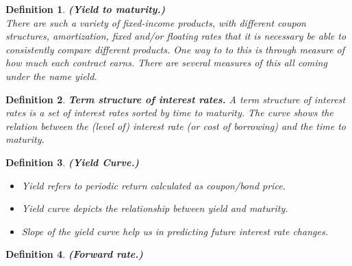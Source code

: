 \documentclass{book}
\newtheorem{definition}{Definition}[section]
\begin{document}
\begin{definition}\textbf{(Yield to maturity.)}\\
There are such a variety of fixed-income products, with different coupon structures, amortization, fixed and/or floating rates that it is necessary  be able to consistently compare different products. One way to to this is through measure of how much each contract earns. There are several measures of this all coming under the name yield.
\end{definition}
\begin{definition}
\textbf{Term structure of interest rates.}
A term structure of interest rates is a set of interest rates sorted by time to maturity. The curve shows the relation between the (level of)
interest rate (or cost of borrowing) and the time to maturity.
\end{definition}
\begin{definition}\textbf{(Yield Curve.)}
\begin{itemize}
\item Yield refers to periodic return calculated as coupon/bond price.
\item Yield curve depicts the relationship between yield and maturity.
\item Slope of the yield curve help us in predicting future interest rate changes.
\end{itemize}
\end{definition}
\begin{definition}\textbf{(Forward rate.)}

\end{definition}
\end{document}
